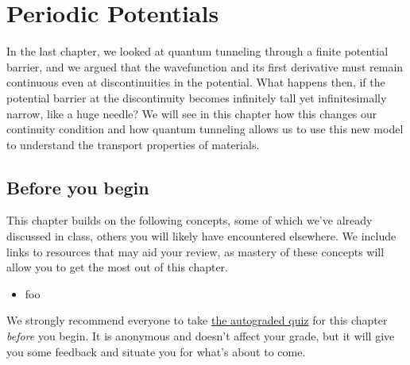 

%

\chapter{Periodic Potentials} \label{ch:period}
In the last chapter, we looked at quantum tunneling through a finite potential barrier, and we argued that the wavefunction and its first derivative must remain continuous even at discontinuities in the potential. 
What happens then, if the potential barrier at the discontinuity becomes infinitely tall yet infinitesimally narrow, like a huge needle? 
We will see in this chapter how this changes our continuity condition and how quantum tunneling allows us to use this new model to understand the transport properties of materials.


\section{Before you begin}

This chapter builds on the following concepts, some of which we've already discussed in class, others you will likely have encountered elsewhere.
We include links to resources that may aid your review, as mastery of these concepts will allow you to get the most out of this chapter.

\begin{itemize}
	\item foo
\end{itemize}

\begin{tcolorbox}[colframe=PaloAlto, colbacktitle=PaloAlto!20!white, title=Pre-check quiz]
	We strongly recommend everyone to take \href{TODO}{the autograded quiz} for this chapter \emph{before} you begin.
	It is anonymous and doesn't affect your grade, but it will give you some feedback and situate you for what's about to come.
\end{tcolorbox}


